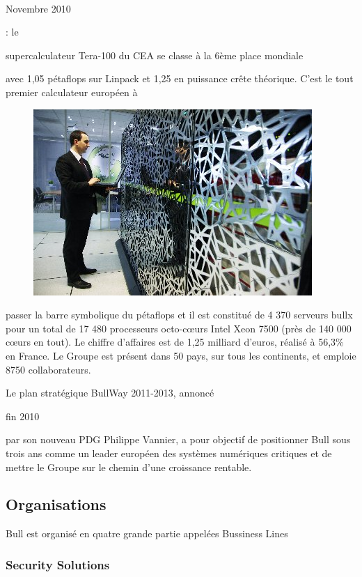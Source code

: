 \documentclass{article}
\begin{document}
		\paragraph{}
		\begin{bf}Novembre 2010\end{bf} : le \begin{bf}supercalculateur Tera-100 du CEA se classe à la 6ème place mondiale\end{bf} 
		avec 1,05 pétaflops sur Linpack et 1,25 en puissance crête théorique. C'est le tout premier calculateur européen à 
		\begin{figure}
		\includegraphics{tera_100.jpg}
		\end{figure}
		passer la barre symbolique du pétaflops et il est constitué de 4 370 serveurs bullx pour un total de 17 480 processeurs 
		octo-cœurs Intel Xeon 7500 (près de 140 000 cœurs en tout). Le chiffre d’affaires est de 1,25 milliard d’euros, 
		réalisé à 56,3\% en France. Le Groupe est présent dans 50 pays, sur tous les continents, et emploie 8750 collaborateurs.

		Le plan stratégique BullWay 2011-2013, annoncé \begin{bf}fin 2010\end{bf} par son nouveau PDG Philippe Vannier, a 
		pour objectif de positionner Bull sous trois ans comme un leader européen des systèmes numériques critiques et de 
		mettre le Groupe sur le chemin d’une croissance rentable.
		\subsection{Organisations}
			Bull est organisé en quatre grande partie appelées Bussiness Lines
			\subsubsection{Security Solutions}
\end{document}
